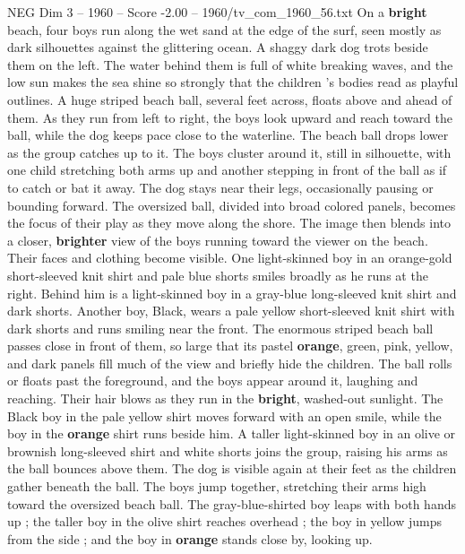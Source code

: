 \begin{textsample}{NEG Dim 3 – 1960 – Score -2.00 – 1960/tv\_com\_1960\_56.txt}  \label{ex:f3_neg_073}
On a \textbf{bright} beach, four boys run along the wet sand at the edge of the surf, seen mostly as dark silhouettes against the glittering ocean.
A shaggy dark dog trots beside them on the left.
The water behind them is full of white breaking waves, and the low sun makes the sea shine so strongly that the children ’s bodies read as playful outlines.
A huge striped beach ball, several feet across, floats above and ahead of them.
As they run from left to right, the boys look upward and reach toward the ball, while the dog keeps pace close to the waterline.
The beach ball drops lower as the group catches up to it.
The boys cluster around it, still in silhouette, with one child stretching both arms up and another stepping in front of the ball as if to catch or bat it away.
The dog stays near their legs, occasionally pausing or bounding forward.
The oversized ball, divided into broad colored panels, becomes the focus of their play as they move along the shore.
The image then blends into a closer, \textbf{brighter} view of the boys running toward the viewer on the beach.
Their faces and clothing become visible.
One light-skinned boy in an orange-gold short-sleeved knit shirt and pale blue shorts smiles broadly as he runs at the right.
Behind him is a light-skinned boy in a gray-blue long-sleeved knit shirt and dark shorts.
Another boy, Black, wears a pale yellow short-sleeved knit shirt with dark shorts and runs smiling near the front.
The enormous striped beach ball passes close in front of them, so large that its pastel \textbf{orange}, green, pink, yellow, and dark panels fill much of the view and briefly hide the children.
The ball rolls or floats past the foreground, and the boys appear around it, laughing and reaching.
Their hair blows as they run in the \textbf{bright}, washed-out sunlight.
The Black boy in the pale yellow shirt moves forward with an open smile, while the boy in the \textbf{orange} shirt runs beside him.
A taller light-skinned boy in an olive or brownish long-sleeved shirt and white shorts joins the group, raising his arms as the ball bounces above them.
The dog is visible again at their feet as the children gather beneath the ball.
The boys jump together, stretching their arms high toward the oversized beach ball.
The gray-blue-shirted boy leaps with both hands up ; the taller boy in the olive shirt reaches overhead ; the boy in yellow jumps from the side ; and the boy in \textbf{orange} stands close by, looking up.

\end{textsample}
